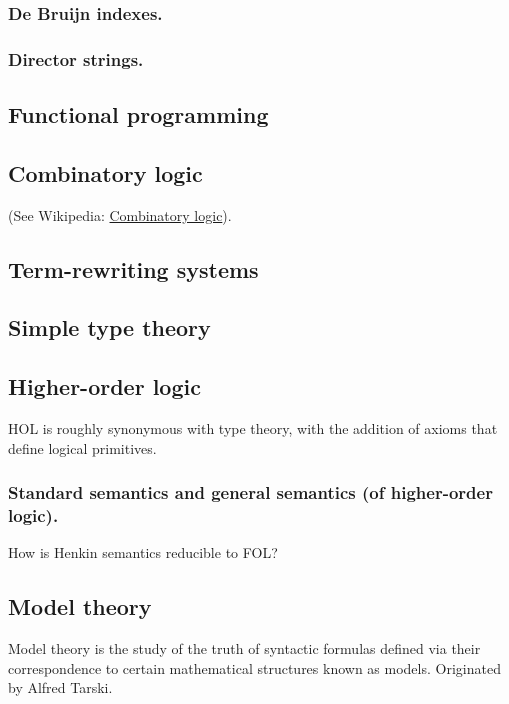 \subsubsection{De Bruijn indexes.}

\subsubsection{Director strings.}

\subsection{Functional programming}

\subsection{Combinatory logic}

(See Wikipedia: \href{http://en.wikipedia.org/wiki/Combinatory_logic}{Combinatory logic}).

\subsection{Term-rewriting systems}

\subsection{Simple type theory}

\subsection{Higher-order logic}

HOL is roughly synonymous with type theory, with the addition of axioms that define logical primitives.

\subsubsection{Standard semantics and general semantics (of higher-order logic).}

How is Henkin semantics reducible to FOL?

\subsection{Model theory}

Model theory is the study of the truth of syntactic formulas defined via their correspondence to certain mathematical structures known as models.  Originated by Alfred Tarski.

